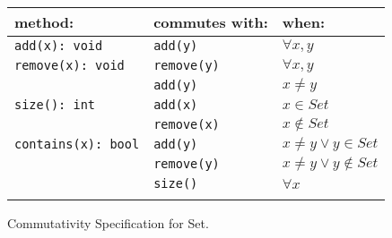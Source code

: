 \begin{tabular}{lll}
\textbf{method:} & \textbf{commutes with:} & \textbf{when:} \\
\hline
\texttt{add(x): void} & \texttt{add(y)} & $\forall x, y$ \\
\texttt{remove(x): void} & \texttt{remove(y)} & $\forall x, y$ \\
    & \texttt{add(y)} & $x \ne y$ \\
\texttt{size(): int} & \texttt{add(x)} & $x \in Set$ \\
    & \texttt{remove(x)} & $x \notin Set$ \\
\texttt{contains(x): bool} & \texttt{add(y)} & $x \ne y \lor y \in Set$ \\
    & \texttt{remove(y)} & $x \ne y \lor y \notin Set$ \\
    & \texttt{size()} & $\forall x$ \\
    \hline
\label{tab:spec}
\end{tabular}
Commutativity Specification for Set.
